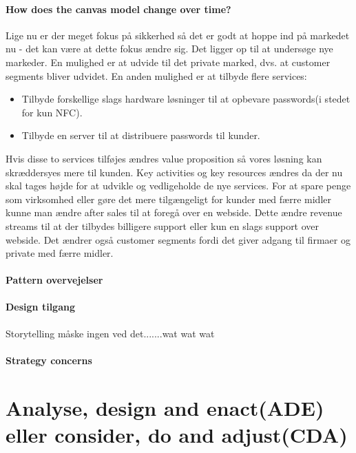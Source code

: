 \documentclass[a4paper]{article}
\begin{document}
\paragraph{How does the canvas model change over time?}
Lige nu er der meget fokus på sikkerhed så det er godt at hoppe ind på markedet nu - det kan være at dette fokus ændre sig.
Det ligger op til at undersøge nye markeder.
En mulighed er at udvide til det private marked, dvs. at customer segments bliver udvidet.
En anden mulighed er at tilbyde flere services:
\begin{itemize}
\item Tilbyde forskellige slags hardware løsninger til at opbevare passwords(i stedet for kun NFC).
\item Tilbyde en server til at distribuere passwords til kunder.
\end{itemize}
Hvis disse to services tilføjes ændres value proposition så vores løsning kan skræddersyes mere til kunden.
Key activities og key resources ændres da der nu skal tages højde for at udvikle og vedligeholde de nye services.
For at spare penge som virksomhed eller gøre det mere tilgængeligt for kunder med færre midler kunne man ændre after sales til at foregå over en webside.
Dette ændre revenue streams til at der tilbydes billigere support eller kun en slags support over webside.
Det ændrer også customer segments fordi det giver adgang til firmaer og private med færre midler.

\paragraph{Pattern overvejelser}

\paragraph{Design tilgang}
Storytelling måske ingen ved det.......wat wat wat

\paragraph{Strategy concerns}

\section{Analyse, design and enact(ADE) eller consider, do and adjust(CDA)}
\end{document}
